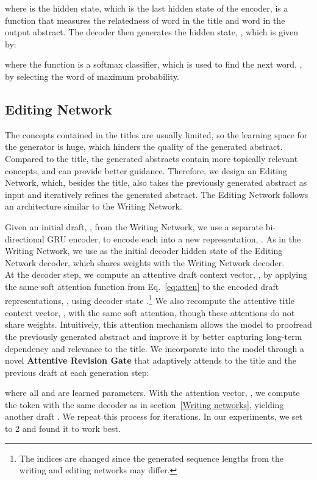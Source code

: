 \documentclass[11pt,a4paper]{article}
\begin{document}
where  is the  hidden state,  which is the last hidden state of the encoder,  is a function that measures the relatedness of word  in the title and word  in the output abstract. The decoder then generates the  hidden state, , which is given by:

where the function  is a softmax classifier, which is used to find the next word, , by selecting the word of maximum probability. 






 \subsection{Editing Network}
The concepts contained in the titles are usually limited, so the learning space for the generator is huge, which hinders the quality of the generated abstract. Compared to the title, the generated abstracts contain more topically relevant concepts, and can provide better guidance. Therefore, we design an Editing Network, which, besides the title, also takes the previously generated abstract as input and iteratively refines the generated abstract. 
The Editing Network follows an architecture similar to the Writing Network. 




Given an initial draft, , from the Writing Network, we use a separate bi-directional GRU encoder, to encode each  into a new representation, . As in the Writing Network, we use  as the initial decoder hidden state of the Editing Network decoder, which shares weights with the Writing Network decoder.\\
\indent At the  decoder step, we compute an attentive draft context vector, , by applying the same soft attention function from Eq.~\eqref{eq:atten} to the encoded draft representations, , using decoder state .\footnote{The indices are changed since the generated sequence lengths from the writing and editing networks may differ.} We also recompute the attentive title context vector, , with the same soft attention, though these attentions do not share weights. Intuitively, this attention mechanism allows the model to proofread the previously generated abstract and improve it by better capturing long-term dependency and relevance to the title.
We incorporate  into the model through a novel \textbf{Attentive Revision Gate} that adaptively attends to the title and the previous draft at each generation step:

where all  and  are learned parameters. With the attention vector, , we compute the  token with the same decoder as in section~\ref{Writing networks}, yielding another draft . We repeat this process for  iterations. In our experiments, we set  to 2 and found it to work best.
%
\end{document}
